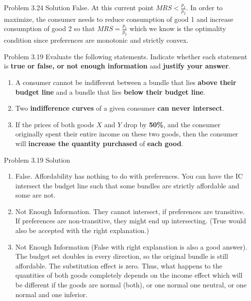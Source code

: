 \documentclass{beamer}
\theoremstyle{plain} %
\theoremstyle{definition} %
\begin{document}
\begin{frame}{Problem 3.24 Solution}
    False. At this current point $MRS<\frac{p_1}{p_2}$. In order to maximize, the consumer needs to reduce consumption of good 1 and increase consumption of good 2 so that $MRS=\frac{p_1}{p_2}$ which we know is the optimality condition since preferences are monotonic and strictly convex.
\end{frame}

\begin{frame}{Problem 3.19}
    Evaluate the following statements. Indicate whether each statement is \textbf{true or false, or not enough information} and \textbf{justify your answer}.

\begin{enumerate}
    \item A consumer cannot be indifferent between a bundle that lies \textbf{above their budget line} and a bundle that lies \textbf{below their budget line}.
    
    \item Two \textbf{indifference curves} of a given consumer \textbf{can never intersect}.
    
    \item If the prices of both goods $X$ and $Y$ drop by \textbf{50\%}, and the consumer originally spent their entire income on these two goods, then the consumer will \textbf{increase the quantity purchased} of \textbf{each good}.
\end{enumerate}

\end{frame}

\begin{frame}{Problem 3.19 Solution}
    \begin{enumerate}
    \item False. Affordability has nothing to do with preferences. You can have the IC intersect the budget line such that some bundles are strictly affordable and some are not. \pause 
    \item Not Enough Information. They cannot intersect, if preferences are transitive. If preferences are non-transitive, they might end up intersecting. (True would also be accepted with the right explanation.) \pause 
    \item Not Enough Information (False with right explanation is also a good answer). The budget set doubles in every direction, so the original bundle is still affordable. The substitution effect is zero. Thus, what happens to the quantities of both goods completely depends on the income effect which will be different if the goods are normal (both), or one normal one neutral, or one normal and one inferior. 
\end{enumerate}
\end{frame}
\end{document}
